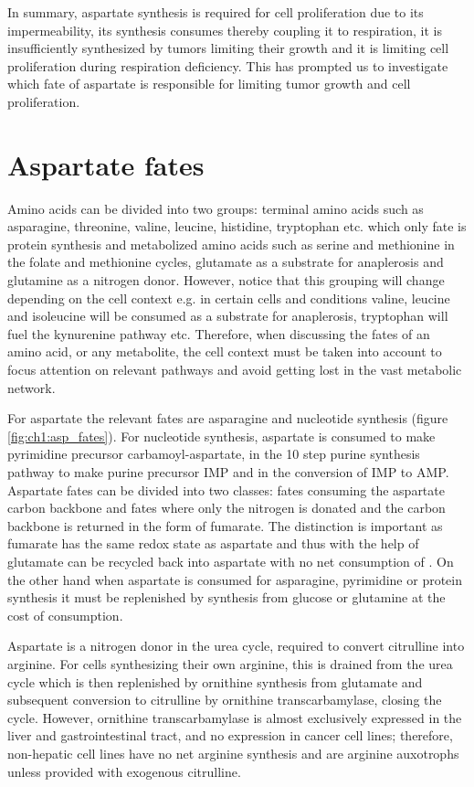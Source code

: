 In summary, aspartate synthesis is required for cell proliferation due to its impermeability, its synthesis consumes \NAD{} thereby coupling it to respiration, it is insufficiently synthesized by tumors limiting their growth and it is limiting cell proliferation during respiration deficiency.
This has prompted us to investigate which fate of aspartate is responsible for limiting tumor growth and cell proliferation.



\section{Aspartate fates}
Amino acids can be divided into two groups: terminal amino acids such as asparagine, threonine, valine, leucine, histidine, tryptophan etc. which only fate is protein synthesis and metabolized amino acids such as serine and methionine in the folate and methionine cycles, glutamate as a substrate for anaplerosis and glutamine as a nitrogen donor.
However, notice that this grouping will change depending on the cell context e.g. in certain cells and conditions valine, leucine and isoleucine will be consumed as a substrate for anaplerosis, tryptophan will fuel the kynurenine pathway etc.
Therefore, when discussing the fates of an amino acid, or any metabolite, the cell context must be taken into account to focus attention on relevant pathways and avoid getting lost in the vast metabolic network.

For aspartate the relevant fates are asparagine and nucleotide synthesis (figure \ref{fig:ch1:asp_fates}).
For nucleotide synthesis, aspartate is consumed to make pyrimidine precursor carbamoyl-aspartate, in the 10 step purine synthesis pathway to make purine precursor IMP and in the conversion of IMP to AMP.
Aspartate fates can be divided into two classes: fates consuming the aspartate carbon backbone and fates where only the nitrogen is donated and the carbon backbone is returned in the form of fumarate.
The distinction is important as fumarate has the same redox state as aspartate and thus with the help of glutamate can be recycled back into aspartate with no net consumption of \NAD.
On the other hand when aspartate is consumed for asparagine, pyrimidine or protein synthesis it must be replenished by synthesis from glucose or glutamine at the cost of \NAD{} consumption.

Aspartate is a nitrogen donor in the urea cycle, required to convert citrulline into arginine.
For cells synthesizing their own arginine, this is drained from the urea cycle which is then replenished by ornithine synthesis from glutamate and subsequent conversion to citrulline by ornithine transcarbamylase, closing the cycle.
However, ornithine transcarbamylase is almost exclusively expressed in the liver and gastrointestinal tract, and no expression in cancer cell lines; therefore, non-hepatic cell lines have no net arginine synthesis and are arginine auxotrophs unless provided with exogenous citrulline.

